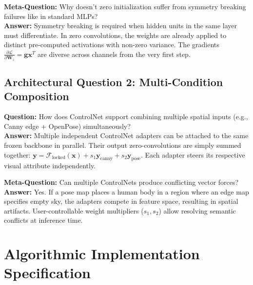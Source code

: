 \documentclass[11pt,a4paper]{article}
\theoremstyle{definition}
\begin{document}
\textbf{Meta-Question:} Why doesn't zero initialization suffer from symmetry breaking failures like in standard MLPs?\\
\textbf{Answer:} Symmetry breaking is required when hidden units in the same layer must differentiate. In zero convolutions, the weights are already applied to distinct pre-computed activations with non-zero variance. The gradients $\frac{\partial \mathcal{L}}{\partial \mathbf{W}_z} = \mathbf{g} \mathbf{x}^T$ are diverse across channels from the very first step.

\subsection{Architectural Question 2: Multi-Condition Composition}
\textbf{Question:} How does ControlNet support combining multiple spatial inputs (e.g., Canny edge + OpenPose) simultaneously?\\
\textbf{Answer:} Multiple independent ControlNet adapters can be attached to the same frozen backbone in parallel. Their output zero-convolutions are simply summed together: $\mathbf{y} = \mathcal{F}_{\text{locked}}(\mathbf{x}) + s_1 \mathbf{y}_{\text{canny}} + s_2 \mathbf{y}_{\text{pose}}$. Each adapter steers its respective visual attribute independently.

\textbf{Meta-Question:} Can multiple ControlNets produce conflicting vector forces?\\
\textbf{Answer:} Yes. If a pose map places a human body in a region where an edge map specifies empty sky, the adapters compete in feature space, resulting in spatial artifacts. User-controllable weight multipliers ($s_1, s_2$) allow resolving semantic conflicts at inference time.

\section{Algorithmic Implementation Specification}
\end{document}
